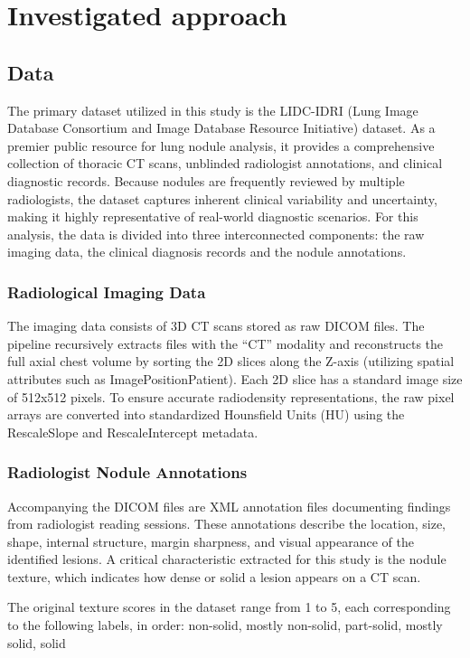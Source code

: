 \chapter{Investigated approach}

\section{Data}

The primary dataset utilized in this study is the LIDC-IDRI (Lung Image Database Consortium and Image Database Resource Initiative) dataset. As a premier public resource for lung nodule analysis, it provides a comprehensive collection of thoracic CT scans, unblinded radiologist annotations, and clinical diagnostic records. Because nodules are frequently reviewed by multiple radiologists, the dataset captures inherent clinical variability and uncertainty, making it highly representative of real-world diagnostic scenarios. For this analysis, the data is divided into three interconnected components: the raw imaging data, the clinical diagnosis records and the nodule annotations.

\subsection{Radiological Imaging Data}
The imaging data consists of 3D CT scans stored as raw DICOM files. The pipeline recursively extracts files with the ``CT'' modality and reconstructs the full axial chest volume by sorting the 2D slices along the Z-axis (utilizing spatial attributes such as ImagePositionPatient). Each 2D slice has a standard image size of 512x512 pixels. To ensure accurate radiodensity representations, the raw pixel arrays are converted into standardized Hounsfield Units (HU) using the RescaleSlope and RescaleIntercept metadata.

\subsection{Radiologist Nodule Annotations}
Accompanying the DICOM files are XML annotation files documenting findings from radiologist reading sessions. These annotations describe the location, size, shape, internal structure, margin sharpness, and visual appearance of the identified lesions. A critical characteristic extracted for this study is the nodule texture, which indicates how dense or solid a lesion appears on a CT scan.

The original texture scores in the dataset range from 1 to 5, each corresponding to the following labels, in order: non-solid, mostly non-solid, part-solid, mostly solid, solid

